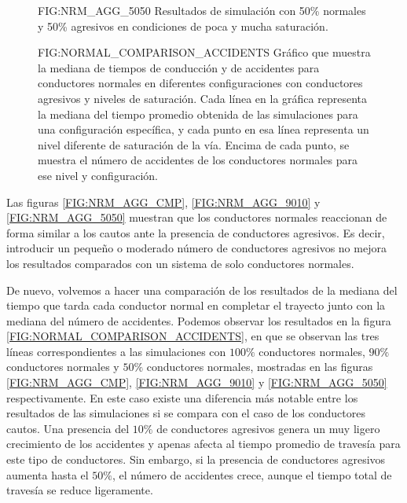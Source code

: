 \begin{figure}[Resultados para conductores Normal y Agresivos, conviviendo 2]{FIG:NRM_AGG_5050}{
    Resultados de simulación con 50\% normales y 50\% agresivos en condiciones de poca y mucha saturación.}
     \hspace{1cm}
     \vspace{1cm}
\end{figure}

\begin{figure}[Mediana de tiempos y accidentes de conductores Normales]{FIG:NORMAL_COMPARISON_ACCIDENTS}{
    Gráfico que muestra la mediana de tiempos de conducción y de accidentes para conductores normales en diferentes configuraciones
    con conductores agresivos y niveles de saturación. Cada línea en la gráfica representa la mediana del tiempo promedio obtenida de las simulaciones para
    una configuración específica, y cada punto en esa línea representa un nivel diferente de saturación de la vía.
    Encima de cada punto, se muestra el número de accidentes de los conductores normales para ese nivel y configuración.
}
\end{figure}

Las figuras \ref{FIG:NRM_AGG_CMP}, \ref{FIG:NRM_AGG_9010} y \ref{FIG:NRM_AGG_5050} muestran que los conductores normales reaccionan de forma similar
a los cautos ante la presencia de conductores agresivos. Es decir, introducir un pequeño o moderado número de conductores agresivos no mejora los resultados
comparados con un sistema de solo conductores normales.

De nuevo, volvemos a hacer una comparación de los resultados de la mediana del tiempo que tarda cada conductor normal en completar el trayecto junto con la mediana
del número de accidentes. Podemos observar los resultados en la figura \ref{FIG:NORMAL_COMPARISON_ACCIDENTS}, en que se observan las tres líneas correspondientes a las simulaciones
con $100\%$ conductores normales, $90\%$ conductores normales y $50\%$ conductores normales, mostradas en las figuras \ref{FIG:NRM_AGG_CMP},
\ref{FIG:NRM_AGG_9010} y \ref{FIG:NRM_AGG_5050} respectivamente. En este caso existe una diferencia más notable entre los resultados de las simulaciones
si se compara con el caso de los conductores cautos. Una presencia del $10\%$ de conductores agresivos genera un muy ligero crecimiento de los accidentes y apenas
afecta al tiempo promedio de travesía para este tipo de conductores. Sin embargo, si la presencia de conductores agresivos aumenta hasta el $50\%$, el número
de accidentes crece, aunque el tiempo total de travesía se reduce ligeramente.

